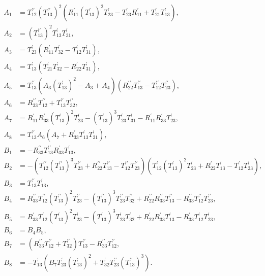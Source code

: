 \documentclass[a4 paper, 12 pt]{extarticle}
\begin{document}
   \[
   \begin{aligned}
   A_1 &= T_{12}^{\prime\prime} (T_{13}^{\prime\prime})^2 \left(R_{11}^\prime (T_{13}^\prime)^2 T_{23}^\prime - T_{23}^\prime R_{11}^\prime + T_{21}^\prime T_{13}^\prime\right) ,\\
   A_2 &= (T_{13}^{\prime\prime})^2 T_{13}^\prime T_{31}^\prime ,\\
   A_3 &= T_{23}^\prime \left(R_{11}^\prime T_{32}^\prime - T_{12}^\prime T_{31}^\prime\right) ,\\
   A_4 &= T_{13}^\prime \left(T_{21}^\prime T_{32}^\prime - R_{22}^\prime T_{31}^\prime\right) ,\\
   A_5 &= T_{13}^{\prime\prime} \left(A_3 (T_{13}^\prime)^2 - A_3 + A_4\right)\left(R_{22}^{\prime\prime} T_{13}^{\prime\prime} - T_{12}^{\prime\prime} T_{23}^{\prime\prime}\right) ,\\
   A_6 &= R_{33}^{\prime\prime} T_{12}^{\prime\prime} + T_{13}^{\prime\prime} T_{32}^{\prime\prime} ,\\
   A_7 &= R_{11}^\prime R_{33}^\prime (T_{13}^\prime)^2 T_{23}^\prime -(T_{13}^\prime)^3 T_{23}^\prime T_{31}^\prime - R_{11}^\prime R_{33}^\prime T_{23}^\prime,\\
   A_8 &= T_{13}^{\prime\prime} A_6 \left(A_7 + R_{33}^\prime T_{13}^\prime T_{21}^\prime\right) ,\\
   B_1 &= -R_{33}^{\prime\prime} T_{13}^{\prime\prime} R_{33}^\prime T_{13}^\prime ,\\
   B_2 &= -\left(T_{12}^{\prime\prime} (T_{13}^{\prime\prime})^3 T_{23}^{\prime\prime} + R_{22}^{\prime\prime} T_{13}^{\prime\prime} - T_{12}^{\prime\prime} T_{23}^{\prime\prime}\right)\left(T_{12}^\prime (T_{13}^\prime)^2 T_{23}^\prime + R_{22}^\prime T_{13}^\prime - T_{12}^\prime T_{23}^\prime\right) ,\\
   B_3 &=  T_{13}^{\prime\prime} T_{13}^\prime ,\\
   B_4 &= R_{33}^{\prime\prime} T_{12}^{\prime\prime} (T_{13}^{\prime\prime})^2 T_{23}^{\prime\prime} - (T_{13}^{\prime\prime})^3 T_{23}^{\prime\prime} T_{32}^{\prime\prime} + R_{22}^{\prime\prime} R_{33}^{\prime\prime} T_{13}^{\prime\prime} - R_{33}^{\prime\prime} T_{12}^{\prime\prime} T_{23}^{\prime\prime} ,\\
   B_5 &= R_{33}^\prime T_{12}^\prime (T_{13}^\prime)^2 T_{23}^\prime - (T_{13}^\prime)^3 T_{23}^\prime T_{32}^\prime + R_{22}^\prime R_{33}^\prime T_{13}^\prime - R_{33}^\prime T_{12}^\prime T_{23}^\prime ,\\
   B_6 &= B_4 B_5 ,\\
   B_7 &= \left(R_{33}^{\prime\prime} T_{12}^{\prime\prime} + T_{32}^{\prime\prime}\right) T_{13}^{\prime\prime} - R_{33}^{\prime\prime} T_{12}^{\prime\prime} ,\\
   B_8 &= -T_{13}^\prime \left(B_7 T_{23}^\prime (T_{13}^\prime)^2 + T_{32}^\prime T_{23}^{\prime\prime} (T_{13}^{\prime\prime})^3\right).
   \end{aligned}\]
   
\end{document}
